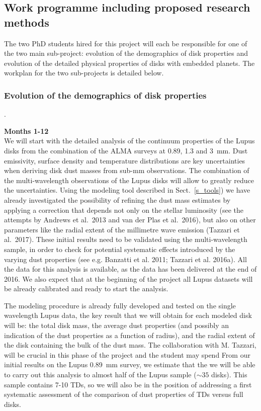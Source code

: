 \documentclass[10pt,fleqn,twoside]{article}
\newcommand{\Tcol}{\color{blue}}
\begin{document}
\subsection{\Tcol Work programme including proposed research methods}
\label{s_work}

The two PhD students hired for this project will each be responsible for one of the two main sub-project:
evolution of the demographics of disk properties and evolution of the detailed physical properties of disks with embedded planets. The workplan for the two sub-projects is detailed below.

\subsubsection{\bf Evolution of the demographics of disk properties}.

{\bf Months 1-12}\\

We will start with the detailed analysis of the continuum properties of the Lupus disks from the combination of the ALMA surveys at 0.89, 1.3 and 3~mm. Dust emissivity, surface density and temperature
distributions are key uncertainties when deriving disk dust masses from sub-mm observations. The combination of the multi-wavelength observations of the Lupus disks will allow to greatly reduce the 
uncertainties. Using the modeling tool described in Sect.~\ref{s_tools}) we have already investigated the
possibility of refining the dust mass estimates by applying a correction that depends not only on the stellar luminosity (see the attempts by Andrews et al.~2013 and van der Plas et al.~2016), but also on other parameters like the radial extent of the millimetre wave emission (Tazzari et al.~2017). These initial results need to be validated using the multi-wavelength sample, in order to check for potential systematic effects introduced by the varying dust properties (see e.g. Banzatti et al. 2011; Tazzari et al. 2016a). All the data for this analysis is available, as the data has been delivered at the end of 2016. We also expect that at the beginning of the project all Lupus datasets will be already calibrated and ready to start the analysis.

The modeling procedure is already fully developed and tested on the single wavelength Lupus data, the key result that we will obtain for each modeled disk will be: the total disk mass, the average dust properties (and possibly an indication of the dust properties as a function of radius), and the radial extent of the disk containing the bulk of the dust mass. The collaboration with M. Tazzari, will be crucial in this phase of the project and the student may spend  From our initial results on the Lupus 0.89~mm survey, we estimate that the we will be able to carry out this analysis to almost half of the Lupus sample ($\sim 35$ disks). This sample contains 7-10 TDs, so we will also be in the position of addressing a first systematic assessment of the comparison of dust properties of TDs versus full disks.
\end{document}
